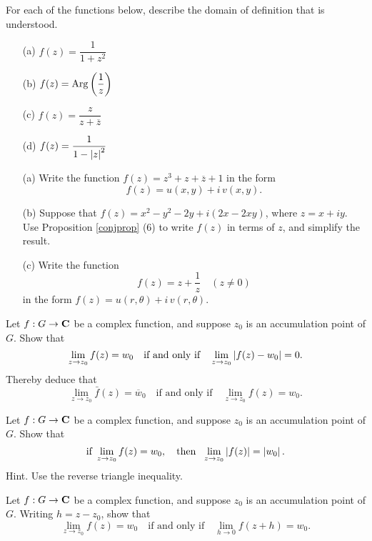\vspace*{0.1in}

\begin{problem}\label{prob 4.4}
For each of the functions below, describe the domain of definition that is understood.
\begin{multicols}{2}
\begin{itemize}
\item[(a)] $f(z) = \dfrac{1}{1 + z^2}$
\item[(b)] $f(z) = \operatorname{Arg}\left(\dfrac{1}{z}\right)$
\item[(c)] $f(z) = \dfrac{z}{z + \overline{z}}$
\item[(d)] $f(z) = \dfrac{1}{1 - \left\lvert z\right\rvert^2}$
\end{itemize}
\end{multicols}
\end{problem}

\vspace{0.1in}

\begin{problem}\label{prob 4.5}\hfill
\begin{itemize}
\item[(a)] Write the function $f(z) = z^3 + z + \overline{z} + 1$ in the form 
\[f(z) = u(x, y) + i\,v(x, y).\]
\item[(b)] Suppose that $f(z) = x^2 - y^2 - 2y + i(2x - 2xy)$, where $z = x + iy$. Use Proposition \ref{conjprop} (6) to write $f(z)$ in terms of $z$, and simplify the result.
\item[(c)] Write the function
\[f(z) = z + \frac{1}{z} \quad (z \neq 0)\]
in the form $f(z) = u(r,\theta) + i\,v(r,\theta)$.
\end{itemize}
\end{problem}

\vspace{0.1in}

\begin{problem}\label{prob 4.6}
Let $f : G \to \mathbf C$ be a complex function, and suppose $z_0$ is an accumulation point of $G$. Show that 
\[\lim_{z \to z_0} f(z) = w_0 \quad \text{if and only if} \quad \lim_{z\to z_0}\left\lvert f(z) - w_0\right\rvert = 0.\]
Thereby deduce that 
\[\lim_{z \to z_0} \bar{f}(z) = \overline{w}_0 \quad \text{if and only if} \quad \lim_{z \to z_0} f(z) = w_0.\]
\end{problem}

\vspace{0.1in}

\begin{problem}\label{prob 4.7}
Let $f : G \to \mathbf C$ be a complex function, and suppose $z_0$ is an accumulation point of $G$. Show that 
\[\text{if }\lim_{z \to z_0} f(z) = w_0, \quad \text{then }\ \lim_{z\to z_0}\left\lvert f(z)\right\rvert = \left\lvert w_0\right\rvert.\]
{\footnotesize Hint. Use the reverse triangle inequality.}
\end{problem}

\vspace{0.1in}

\begin{problem}\label{prob 4.8}
Let $f : G \to \mathbf C$ be a complex function, and suppose $z_0$ is an accumulation point of $G$. Writing $h = z - z_0$, show that 
\[\lim_{z \to z_0} f(z) = w_0 \quad \text{if and only if} \quad \lim_{h \to 0}f(z + h) = w_0.\]
\end{problem}